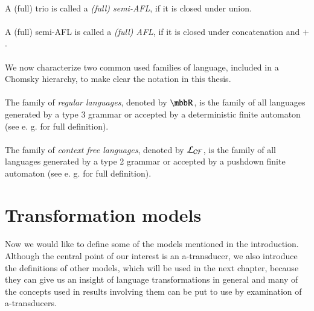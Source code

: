 \paragraph{}
 A (full) trio is called a \emph{(full) semi-AFL}, if it is closed under union.

\paragraph{}
 A (full) semi-AFL is called a \emph{(full) AFL}, if it is closed under concatenation and $+$.

\paragraph{}
We now characterize two common used families of language, included in a Chomsky hierarchy, to make clear the notation in this thesis.

\paragraph{}
\oznacenie The family of \emph{regular languages}, denoted by $\R $, is the family of all languages generated by a type 3 grammar or accepted by a deterministic finite automaton (see e. g. \cite{hopcroft:fola} for full definition).

\paragraph{}
\oznacenie The family of \emph{context free languages}, denoted by $\CF $, is the family of all languages generated by a type 2 grammar or accepted by a pushdown finite automaton (see e. g. \cite{hopcroft:fola} for full definition).

\section{Transformation models}
\paragraph{}
Now we would like to define some of the models mentioned in the introduction. Although the central point of our interest is an a-transducer, we also introduce the definitions of other models, which will be used in the next chapter, because they can give us an insight of language transformations in general and many of the concepts used in results involving them can be put to use by examination of a-transducers.


